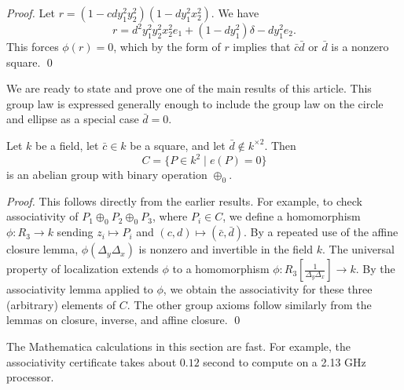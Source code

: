 \documentclass{llncs}
\newcommand{\f}[1]{\frac{1}{#1}}
\begin{document}
\begin{proof} 
  Let $r = (1 - c d y_1^2 y_2 ^2) (1 - d y_1^2 x_2^2)$.  We have
\begin{equation}\label{eqn:squares}
r = d^2 y_1^2 y_2^2 x_2^2 e_1 + (1 - d y_1^2) \delta - d y_1^2 e_2.
\end{equation}
This forces $\phi(r)=0$, which by the form of $r$ implies that $\bar
c\bar d$ or $\bar d$ is a nonzero square.
\qed\end{proof}

We are ready to state and prove one of the main results of this
article.  This group law is expressed generally enough
to include the group law on the circle and ellipse as a special case
$\bar d = 0$.

\begin{theorem}\label{thm:group} 
  Let $k$ be a field, let $\bar c \in k$ be a square, and let $\bar
  d\not\in k^{\times 2}$.  
  Then 
  \[
  C= \{P\in k^2 \mid  e(P) = 0\}
  \]
   is an abelian
  group with binary operation $\oplus_0$.
\end{theorem}

\begin{proof} This follows directly from the earlier results.  For
  example, to check associativity of $P_1\oplus_0 P_2\oplus_0 P_3$, where
  $P_i\in C$, we define a homomorphism $\phi:R_3\to k$ sending
  $z_i\mapsto P_i$ and $(c,d)\mapsto (\bar c,\bar d)$.  By a repeated
  use of the affine closure lemma, $\phi(\Delta_y\Delta_x)$ is nonzero
  and invertible in the field $k$.  The universal property of
  localization extends $\phi$ to a homomorphism
  $\phi:R_3[\f{\Delta_y\Delta_x}]\to k$.  By the associativity lemma
  applied to $\phi$, we obtain the associativity for these three
  (arbitrary) elements of $C$.  The other group axioms follow similarly
  from the lemmas on closure, inverse, and affine closure.
\qed\end{proof}

The Mathematica calculations in this section are fast. For example,
the associativity certificate takes about $0.12$ second to compute on
a 2.13 GHz processor.  
\end{document}
